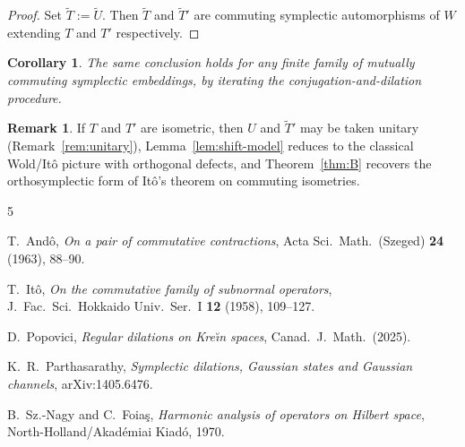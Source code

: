 \documentclass[11pt,a4paper]{article}
\newtheorem{corollary}[theorem]{Corollary}
\theoremstyle{definition}
\newtheorem{remark}[theorem]{Remark}
\begin{document}
\begin{proof}
Set \(\widetilde{T}:=\widetilde{U}\). Then \(\widetilde{T}\) and \(\widetilde{T}'\) are commuting
symplectic automorphisms of \(W\) extending \(T\) and \(T'\) respectively.
\end{proof}

\begin{corollary}
The same conclusion holds for any finite family of mutually commuting symplectic embeddings, by
iterating the conjugation-and-dilation procedure.
\end{corollary}

\begin{remark}
If \(T\) and \(T'\) are isometric, then \(U\) and \(\widetilde{T}'\) may be taken unitary
(Remark~\ref{rem:unitary}), Lemma~\ref{lem:shift-model} reduces to the classical Wold/It\^o
picture with orthogonal defects, and Theorem~\ref{thm:B} recovers the orthosymplectic form of
It\^o's theorem on commuting isometries.
\end{remark}

\begin{thebibliography}{5}

T.~And\^o,
\textit{On a pair of commutative contractions},
Acta Sci.\ Math.\ (Szeged) \textbf{24} (1963), 88--90.

T.~It\^o,
\textit{On the commutative family of subnormal operators},
J.\ Fac.\ Sci.\ Hokkaido Univ.\ Ser.\ I \textbf{12} (1958), 109--127.

D.~Popovici,
\textit{Regular dilations on Kre\u{\i}n spaces},
Canad.\ J.\ Math.\ (2025).

K.~R.~Parthasarathy,
\textit{Symplectic dilations, Gaussian states and Gaussian channels},
arXiv:1405.6476.

B.~Sz.-Nagy and C.~Foia\c{s},
\textit{Harmonic analysis of operators on Hilbert space},
North-Holland/Akad\'emiai Kiad\'o, 1970.

\end{thebibliography}
\end{document}
